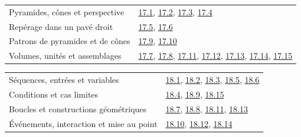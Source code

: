 \begin{tabularx}{\linewidth}{@{}Yl@{}}\toprule
Pyramides, cônes et perspective & \hyperref[exo-17-1]{17.1}, \hyperref[exo-17-2]{17.2}, \hyperref[exo-17-3]{17.3}, \hyperref[exo-17-4]{17.4}\\[2mm]
Repérage dans un pavé droit & \hyperref[exo-17-5]{17.5}, \hyperref[exo-17-6]{17.6}\\[2mm]
Patrons de pyramides et de cônes & \hyperref[exo-17-9]{17.9}, \hyperref[exo-17-10]{17.10}\\[2mm]
Volumes, unités et assemblages & \hyperref[exo-17-7]{17.7}, \hyperref[exo-17-8]{17.8}, \hyperref[exo-17-11]{17.11}, \hyperref[exo-17-12]{17.12}, \hyperref[exo-17-13]{17.13}, \hyperref[exo-17-14]{17.14}, \hyperref[exo-17-15]{17.15}\\[2mm]
\bottomrule\end{tabularx}\par\vspace{4mm}
\begin{tabularx}{\linewidth}{@{}Yl@{}}\toprule
Séquences, entrées et variables & \hyperref[exo-18-1]{18.1}, \hyperref[exo-18-2]{18.2}, \hyperref[exo-18-3]{18.3}, \hyperref[exo-18-5]{18.5}, \hyperref[exo-18-6]{18.6}\\[2mm]
Conditions et cas limites & \hyperref[exo-18-4]{18.4}, \hyperref[exo-18-9]{18.9}, \hyperref[exo-18-15]{18.15}\\[2mm]
Boucles et constructions géométriques & \hyperref[exo-18-7]{18.7}, \hyperref[exo-18-8]{18.8}, \hyperref[exo-18-11]{18.11}, \hyperref[exo-18-13]{18.13}\\[2mm]
Événements, interaction et mise au point & \hyperref[exo-18-10]{18.10}, \hyperref[exo-18-12]{18.12}, \hyperref[exo-18-14]{18.14}\\[2mm]
\bottomrule\end{tabularx}\par\vspace{4mm}
\clearpage
